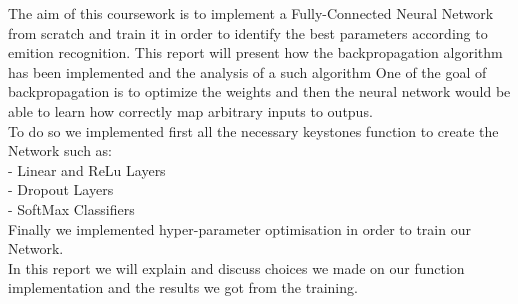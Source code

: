 The aim of this coursework is to implement a Fully-Connected Neural Network from scratch and train it in order to identify the best parameters according to emition recognition.
This report will present how the backpropagation algorithm has been implemented and the analysis of a such algorithm
One of the goal of backpropagation is to optimize the weights and then the neural network would be able to learn how correctly map arbitrary inputs to outpus.  \\

To do so we implemented first all the necessary keystones function to create the Network such as: \\
	- Linear and ReLu Layers \\
	- Dropout Layers \\
	- SoftMax Classifiers \\

Finally we implemented hyper-parameter optimisation in order to train our Network.\\
In this report we will explain and discuss choices we made on our function implementation and the results we got from the training.

